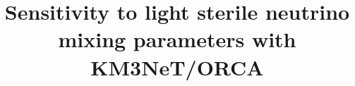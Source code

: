 \documentclass[preprint,12pt]{elsarticle}
\begin{document}
\begin{frontmatter}



\title{Sensitivity to light sterile neutrino mixing parameters with KM3NeT/ORCA}





\end{frontmatter}
\end{document}
